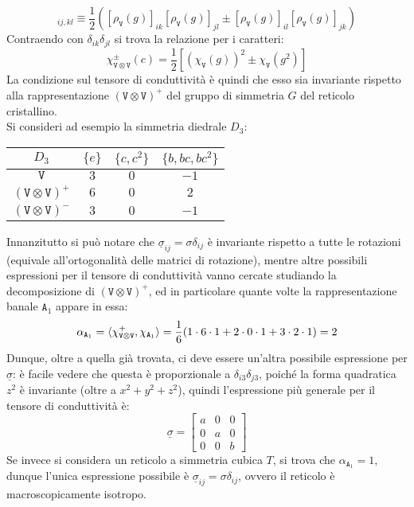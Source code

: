 \begin{equation}
	[\rho_{\mathtt{V} \otimes \mathtt{V}}^{\pm}(g)]_{ij,kl} \equiv \frac{1}{2} \left( [\rho_{\mathtt{V}}(g)]_{ik} [\rho_{\mathtt{V}}(g)]_{jl} \pm [\rho_{\mathtt{V}}(g)]_{il} [\rho_{\mathtt{V}}(g)]_{jk} \right)
	\label{eq:8.35}
\end{equation}
Contraendo con $ \delta_{ik} \delta_{jl} $ si trova la relazione per i caratteri:
\begin{equation}
	\chi_{\mathtt{V} \otimes \mathtt{V}}^{\pm}(c) = \frac{1}{2} \left[ (\chi_{\mathtt{V}}(g))^2 \pm \chi_{\mathtt{V}}(g^2) \right]
	\label{eq:8.36}
\end{equation}
La condizione sul tensore di conduttività è quindi che esso sia invariante rispetto alla rappresentazione $ (\mathtt{V} \otimes \mathtt{V})^+ $ del gruppo di simmetria $ G $ del reticolo cristallino.\\
Si consideri ad esempio la simmetria diedrale $ D_3 $:

\begin{table}[H]
	\centering
	\begin{tabular}{c|ccc}
		$ D_3 $ & $ \{e\} $ & $ \{c,c^2\} $ & $ \{b,bc,bc^2\} $ \\
		\hline
		$ \mathtt{V} $ & $ 3 $ & $ 0 $ & $ -1 $ \\
		$ \left( \mathtt{V} \otimes \mathtt{V} \right)^+ $ & $ 6 $ & $ 0 $ & $ 2 $ \\
		$ \left( \mathtt{V} \otimes \mathtt{V} \right)^- $ & $ 3 $ & $ 0 $ & $ -1 $
	\end{tabular}
\end{table}
Innanzitutto si può notare che $ \underline{\sigma}_{ij} = \sigma \delta_{ij} $ è invariante rispetto a tutte le rotazioni (equivale all'ortogonalità delle matrici di rotazione), mentre altre possibili espressioni per il tensore di conduttività vanno cercate studiando la decomposizione di $ \left( \mathtt{V} \otimes \mathtt{V} \right)^+ $, ed in particolare quante volte la rappresentazione banale $ \mathtt{A}_1 $ appare in essa:
\begin{equation*}
	\alpha_{\mathtt{A}_1} = \braket{\chi_{\mathtt{V} \otimes \mathtt{V}}^+, \chi_{\mathtt{A}_1}} = \frac{1}{6} (1 \cdot 6 \cdot 1 + 2 \cdot 0 \cdot 1 + 3 \cdot 2 \cdot 1) = 2
\end{equation*}
Dunque, oltre a quella già trovata, ci deve essere un'altra possibile espressione per $ \underline{\sigma} $: è facile vedere che questa è proporzionale a $ \delta_{i3} \delta_{j3} $, poiché la forma quadratica $ z^2 $ è invariante (oltre a $ x^2 + y^2 + z^2 $), quindi l'espressione più generale per il tensore di conduttività è:
\begin{equation*}
	\underline{\sigma} =
	\begin{bmatrix}
		a & 0 & 0 \\
		0 & a & 0 \\
		0 & 0 & b
	\end{bmatrix}
\end{equation*}
Se invece si considera un reticolo a simmetria cubica $ T $, si trova che $ \alpha_{\mathtt{A}_1} = 1 $, dunque l'unica espressione possibile è $ \underline{\sigma}_{ij} = \sigma \delta_{ij} $, ovvero il reticolo è macroscopicamente isotropo.

